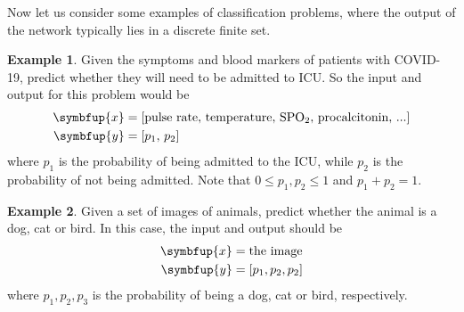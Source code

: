 \documentclass[11pt]{extarticle}
\newcommand{\vx}{\symbfup{x}}
\newcommand{\vy}{\symbfup{y}}
\theoremstyle{definition}
\newtheorem{example}{Example}%
\begin{document}
Now let us consider some examples of classification problems, where the output of the network typically lies in a discrete finite set.
\begin{example}
  Given the symptoms and blood markers of patients with COVID-19, predict whether they will need to be admitted to ICU. So the input and output for this problem would be
  \begin{equation*}
    \begin{aligned}
    \vx &= [\text{pulse rate},\,\text{temperature},\,\text{SPO}_2,\,\text{procalcitonin},\,... ]\\
    \vy &= [p_1,\,p_2]
    \end{aligned}
  \end{equation*}
  where $p_1$ is the probability of being admitted to the ICU, while $p_2$ is the probability of not being admitted. Note that $0 \leqslant p_1, p_2 \leq1$ and $p_1 + p_2 = 1$.
\end{example}

\begin{example}\label{ex:3class}
Given a set of images of animals, predict whether the animal is a dog, cat or bird. In this case, the input and output should be
\begin{equation*}
  \begin{aligned}
  \vx &= \text{the image}\\
  \vy &= [p_1,p_2,p_2]
  \end{aligned}
\end{equation*}
where $p_1,p_2,p_3$ is the probability of being a dog, cat or bird, respectively.
\end{example}
\end{document}
